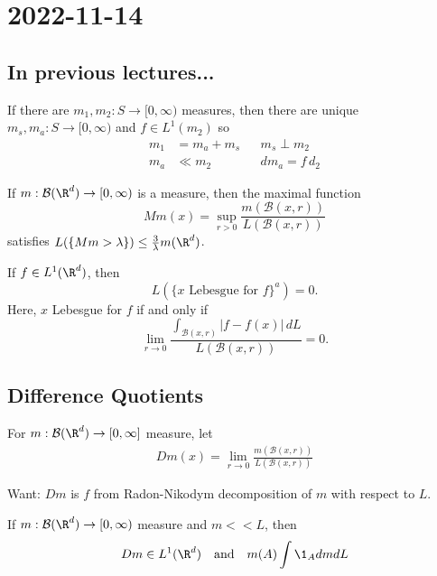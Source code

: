 \section{2022-11-14}

\subsection*{In previous lectures...}

\begin{theorem}
	If there are $m_1, m_2 : S \to [0, \infty)$ measures, then there are unique $m_s, m_a : S \to [0, \infty)$ and $f \in L^{1} (m_2)$ so
	\begin{align*}
		m_1 &= m_a + m_s && m_s \perp m_2 \\
		m_a &\ll m_2 && dm_a = f \, d_2
	\end{align*}
\end{theorem}

\begin{theorem}
	If $m : \mathcal{B}(\R^d) \to [0, \infty)$ is a measure, then the maximal function
	\[
		Mm(x) = \sup_{r > 0} \frac{m(\mathcal{B}(x,r))}{L(\mathcal{B}(x,r))}
	\]
	satisfies $L(\{ Mm > \lambda \} ) \leq \frac{3}{\lambda}m(\R^d)$.
\end{theorem}

\begin{theorem}
	If $f \in L^{1} (\R^d)$, then 
	\[
		L(\{ x \textrm{ Lebesgue for } f \}^a) = 0.
	\] 
	Here, $x$ Lebesgue for $f$ if and only if
	\[
		\lim_{r \to 0} \frac{\int_{\mathcal{B}(x,r)} |f - f(x)| \, dL}{L(\mathcal{B}(x,r))} = 0.
	\]
\end{theorem}

\subsection{Difference Quotients}

\begin{definition}
	For $m: \mathcal{B}(\R^d) \to [0, \infty]$ measure,
	let
	\begin{align*}
		D m (x) = \lim_{r \to 0} \frac{m ( \mathcal{B} (x, r))}{L(\mathcal{B}(x, r))}
	\end{align*}

	Want: $D m$ is $f$ from Radon-Nikodym decomposition of $m$ with respect to $L$.
\end{definition}

\begin{theorem}
	If $m: \mathcal{B}(\R^d) \to [0, \infty)$ measure and $m << L$, then
	\begin{align*}
		D m \in L^{1} (\R^d) \quad \text{and} \quad m(A) \int \1_A dm dL
	\end{align*}
\end{theorem}

